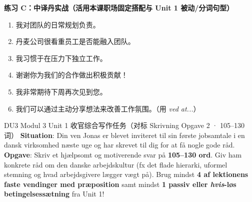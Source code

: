 \textbf{练习 C：中译丹实战（活用本课职场固定搭配与 Unit 1 被动/分词句型）}
\begin{enumerate}
  \item 我对团队的日常规划负责。
  \item 丹麦公司很看重员工是否能融入团队。
  \item 我习惯于在压力下独立工作。
  \item 谢谢你为我们的合作做出积极贡献！
  \item 我非常期待下周再次见到您。
  \item 我们可以通过主动分享想法来改善工作氛围。（用 \textit{ved at...}）
\end{enumerate}


\begin{emailbox}{DU3 Modul 3 Unit 1 收官综合写作任务（对标 Skrivning Opgave 2 · 105--130 词）}
\textbf{Situation}: Din ven Jonas er blevet inviteret til sin første jobsamtale i en dansk virksomhed næste uge og har skrevet til dig for at få nogle gode råd.\\
\textbf{Opgave}: Skriv et hjælpsomt og motiverende svar på \textbf{105--130 ord}. Giv ham konkrete råd om den danske arbejdskultur (fx det flade hierarki, uformel stemning og hvad arbejdsgivere lægger vægt på). Brug mindst \textbf{4 af lektionens faste vendinger med præposition} samt mindst \textbf{1 passiv eller \textit{hvis}-løs betingelsessætning} fra Unit 1!
\end{emailbox}

